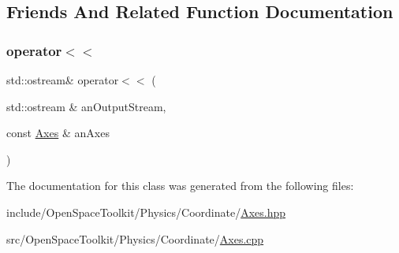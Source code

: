 \subsection{Friends And Related Function Documentation}
\mbox{\label{classostk_1_1physics_1_1coord_1_1_axes_a0ed7e604ae11f069877a8ee1a2d9b051}} 
\subsubsection{\texorpdfstring{operator$<$$<$}{operator<<}}
{\footnotesize\ttfamily std\+::ostream\& operator$<$$<$ (\begin{DoxyParamCaption}\item[{std\+::ostream \&}]{an\+Output\+Stream,  }\item[{const \hyperlink{classostk_1_1physics_1_1coord_1_1_axes}{Axes} \&}]{an\+Axes }\end{DoxyParamCaption})\hspace{0.3cm}{\ttfamily [friend]}}



The documentation for this class was generated from the following files\+:\begin{DoxyCompactItemize}
\item 
include/\+Open\+Space\+Toolkit/\+Physics/\+Coordinate/\hyperlink{_axes_8hpp}{Axes.\+hpp}\item 
src/\+Open\+Space\+Toolkit/\+Physics/\+Coordinate/\hyperlink{_axes_8cpp}{Axes.\+cpp}\end{DoxyCompactItemize}
